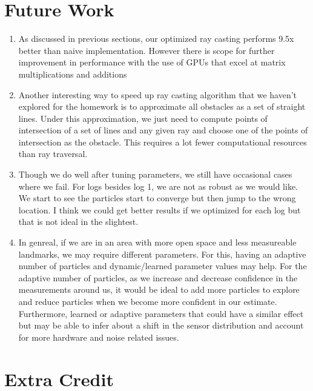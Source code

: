\documentclass[12pt, a4paper]{article}
\begin{document}
\section{Future Work}
\begin{enumerate}
  \item As discussed in previous sections, our optimized ray casting performs 9.5x better than naive implementation. However there is scope for further improvement in performance with the use of GPUs that excel at matrix multiplications and additions
  \item Another interesting way to speed up ray casting algorithm that we haven't explored for the homework is to approximate all obstacles as a set of straight lines. Under this approximation, we just need to compute points of intersection of a set of lines and any given ray and choose one of the points of intersection as the obstacle. This requires a lot fewer computational resources than ray traversal. 
  \item Though we do well after tuning parameters, we still have occasional cases where we fail. For logs besides log 1, we are not as robust as we would like. We start to see the particles start to converge but then jump to the wrong location. I think we could get better results if we optimized for each log but that is not ideal in the slightest.
  \item In genreal, if we are in an area with more open space and less measureable landmarks, we may require different parameters. For this, having an adaptive number of particles and dynamic/learned parameter values may help. For the adaptive number of particles, as we increase and decrease confidence in the measurements around us, it would be ideal to add more particles to explore and reduce particles when we become more confident in our estimate. Furthermore, learned or adaptive parameters that could have a similar effect but may be able to infer about a shift in the sensor distribution and account for more hardware and noise related issues.
\end{enumerate}




\section{Extra Credit}
\end{document}
